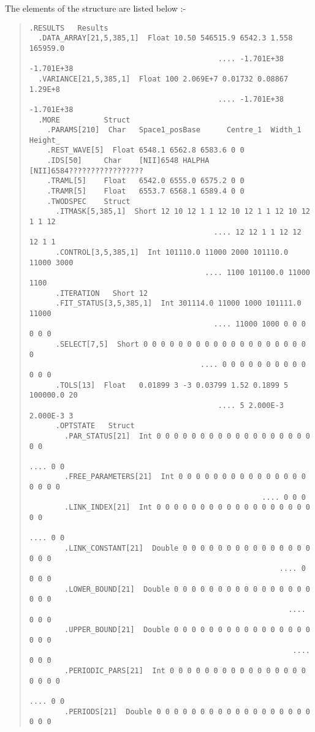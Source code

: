 The elements of the structure are listed below :-

\begin{quote}
\small
\begin{verbatim}
.RESULTS   Results
  .DATA_ARRAY[21,5,385,1]  Float 10.50 546515.9 6542.3 1.558 165959.0
                                           .... -1.701E+38 -1.701E+38
  .VARIANCE[21,5,385,1]  Float 100 2.069E+7 0.01732 0.08867 1.29E+8
                                           .... -1.701E+38 -1.701E+38
  .MORE          Struct
    .PARAMS[210]  Char   Space1_posBase      Centre_1  Width_1   Height_
    .REST_WAVE[5]  Float 6548.1 6562.8 6583.6 0 0
    .IDS[50]     Char    [NII]6548 HALPHA    [NII]6584?????????????????
    .TRAML[5]    Float   6542.0 6555.0 6575.2 0 0
    .TRAMR[5]    Float   6553.7 6568.1 6589.4 0 0
    .TWODSPEC    Struct
      .ITMASK[5,385,1]  Short 12 10 12 1 1 12 10 12 1 1 12 10 12 1 1 12
                                          .... 12 12 1 1 12 12 12 1 1
      .CONTROL[3,5,385,1]  Int 101110.0 11000 2000 101110.0 11000 3000
                                        .... 1100 101100.0 11000 1100
      .ITERATION   Short 12
      .FIT_STATUS[3,5,385,1]  Int 301114.0 11000 1000 101111.0 11000
                                          .... 11000 1000 0 0 0 0 0 0
      .SELECT[7,5]  Short 0 0 0 0 0 0 0 0 0 0 0 0 0 0 0 0 0 0 0 0
                                       .... 0 0 0 0 0 0 0 0 0 0 0 0 0
      .TOLS[13]  Float   0.01899 3 -3 0.03799 1.52 0.1899 5 100000.0 20
                                           .... 5 2.000E-3 2.000E-3 3
      .OPTSTATE   Struct
        .PAR_STATUS[21]  Int 0 0 0 0 0 0 0 0 0 0 0 0 0 0 0 0 0 0 0 0
                                                             .... 0 0
        .FREE_PARAMETERS[21]  Int 0 0 0 0 0 0 0 0 0 0 0 0 0 0 0 0 0 0 0
                                                     .... 0 0 0
        .LINK_INDEX[21]  Int 0 0 0 0 0 0 0 0 0 0 0 0 0 0 0 0 0 0 0 0
                                                             .... 0 0
        .LINK_CONSTANT[21]  Double 0 0 0 0 0 0 0 0 0 0 0 0 0 0 0 0 0 0
                                                         .... 0 0 0 0
        .LOWER_BOUND[21]  Double 0 0 0 0 0 0 0 0 0 0 0 0 0 0 0 0 0 0 0
                                                           .... 0 0 0
        .UPPER_BOUND[21]  Double 0 0 0 0 0 0 0 0 0 0 0 0 0 0 0 0 0 0 0
                                                            .... 0 0 0
        .PERIODIC_PARS[21]  Int 0 0 0 0 0 0 0 0 0 0 0 0 0 0 0 0 0 0 0 0
                                                             .... 0 0
        .PERIODS[21]  Double 0 0 0 0 0 0 0 0 0 0 0 0 0 0 0 0 0 0 0 0 0

\end{verbatim}
\end{quote}
